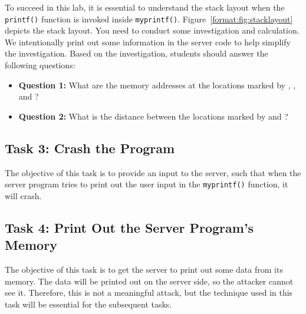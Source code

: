 To succeed in this lab, it is essential to understand the stack layout when
the \texttt{printf()} function is invoked inside \texttt{myprintf()}. 
Figure~\ref{format:fig:stacklayout} depicts the stack layout. 
You need to conduct some investigation and calculation. 
We intentionally print out some information in the server code to
help simplify the investigation. Based on the investigation,
students should answer the following questions: 

\begin{itemize} 
\item \textbf{Question 1:}  What are the memory addresses at the locations marked by
, , and ?

\item \textbf{Question 2:} What is the distance between the locations marked
by  and ?
\end{itemize} 

 

\subsection{Task 3: Crash the Program}

The objective of this task is to provide an input to the server, such that
when the server program tries to print out the user input in the 
\texttt{myprintf()} function, it will crash.  


\subsection{Task 4: Print Out the Server Program's Memory}

The objective of this task is to get the server to print out some data 
from its memory. The data will be printed out on the server side, so
the attacker cannot see it. Therefore, this is not a meaningful
attack, but the technique used in this task will be essential for 
the subsequent tasks. 


